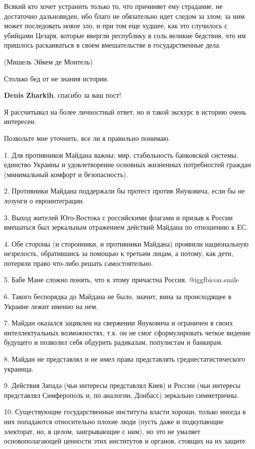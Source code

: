 \begin{itemize}

Всякий кто хочет устранить только то, что причиняет ему страдание, не
достаточно дальновиден, ибо благо не обязательно идет следом за злом; за ним
может последовать новое зло, и при том еще худшее, как это случилось с убийцами
Цезаря, которые ввергли республику в соль великие бедствия, что им пришлось
раскаиваться в своем вмешательстве в государственные дела.

(Мишель Эйкем де Монтель)

Столько бед от не знания истории.

\textbf{Denis Zharkih}, спасибо за ваш пост!

Я рассчитывал на более личностный ответ, но и такой экскурс в историю очень
интересен.

Позвольте мне уточнить, все ли я правильно понимаю.

1. Для противников Майдана важны: мир, стабильность банковской системы,
единство Украины и удовлетворение основных жизненных потребностей граждан
(минимальный комфорт и безопасность).

2. Противники Майдана поддержали бы протест против Януковича, если бы не
лозунги о евроинтеграции.

3. Выход жителей Юго-Востока с российскими флагами и призыв к России вмешаться
был зеркальным отражением действий Майдана по отношению к ЕС.

4. Обе стороны (и сторонники, и противники Майдана) проявили национальную
незрелость, обратившись за помощью к третьим лицам, а потому, как дети,
потеряли право что-либо решать самостоятельно.

5. Бабе Мане сложно понять, что к этому причастна Россия.  @igg{fbicon.smile} 

6. Такого беспорядка до Майдана не было, значит, вина за происходящее в Украине
лежит именно на нем.

7. Майдан оказался зациклен на свержении Януковича и ограничен в своих
интеллектуальных возможностях, т.к. он не смог сформулировать четкое видение
будущего и позволил себя обдурить радикалам, популистам и банкирам.

8. Майдан не представлял и не имел права представлять среднестатистического
украинца.

9. Действия Запада (чьи интересы представлял Киев) и России (чьи интересы
представлял Симферополь и, по аналогии, Донбасс) зеркально симметричны.

10. Существующие государственные институты власти хороши, только иногда в них
попадаются относительно плохие люди (пусть даже и подкупающие электорат, но, в
целом, заигрывающие с ним), но это не умаляет основополагающей ценности этих
институтов и органов, стоящих на их защите.


\end{itemize}

